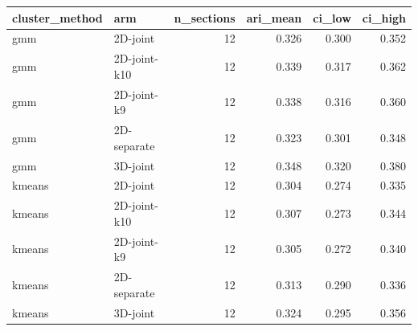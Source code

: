 \begin{tabular}{llrrrr}
\toprule
cluster_method & arm & n_sections & ari_mean & ci_low & ci_high \\
\midrule
gmm & 2D-joint & 12 & 0.326 & 0.300 & 0.352 \\
gmm & 2D-joint-k10 & 12 & 0.339 & 0.317 & 0.362 \\
gmm & 2D-joint-k9 & 12 & 0.338 & 0.316 & 0.360 \\
gmm & 2D-separate & 12 & 0.323 & 0.301 & 0.348 \\
gmm & 3D-joint & 12 & 0.348 & 0.320 & 0.380 \\
kmeans & 2D-joint & 12 & 0.304 & 0.274 & 0.335 \\
kmeans & 2D-joint-k10 & 12 & 0.307 & 0.273 & 0.344 \\
kmeans & 2D-joint-k9 & 12 & 0.305 & 0.272 & 0.340 \\
kmeans & 2D-separate & 12 & 0.313 & 0.290 & 0.336 \\
kmeans & 3D-joint & 12 & 0.324 & 0.295 & 0.356 \\
\bottomrule
\end{tabular}
